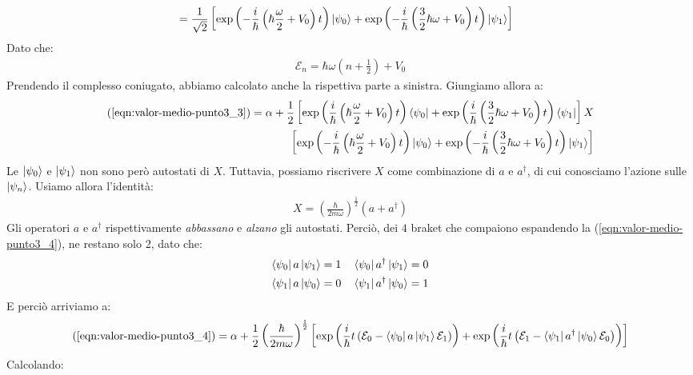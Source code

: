 \documentclass[../../FisicaTeorica.tex]{subfiles}
\begin{document}
\begin{enumerate}
\begin{align*}
\\
\span= \frac{1}{\sqrt{2}} \left[
\exp\left({-\frac{i}{\hbar}\left(\hbar\frac{\omega}{2} + V_0\right)t}\right)\ket{\psi_0} +
\exp\left({-\frac{i}{\hbar}\left(\frac{3}{2}\hbar \omega + V_0\right)t}\right)\ket{\psi_1}
\right]
\end{align*}
Dato che:
\begin{align*}
\mathcal{E}_n = \hbar \omega \left(n+\frac{1}{2}\right) + V_0
\end{align*}
Prendendo il complesso coniugato, abbiamo calcolato anche la rispettiva parte a sinistra. Giungiamo allora a:
\begin{align}\nonumber
(\ref{eqn:valor-medio-punto3_3}) = \alpha +\frac{1}{2}\left[\exp\left(\frac{i}{\hbar}\left(\hbar \frac{\omega}{2}+ V_0\right)t \right)\Bra{\psi_0}+\exp\left(\frac{i}{\hbar}\left(\frac{3}{2}\hbar \omega + V_0\right)t\right)\Bra{\psi_1}\right] X\\
\left[\exp\left(-\frac{i}{\hbar}\left(\hbar \frac{\omega}{2}+V_0\right)t\right) \Ket{\psi_0} + \exp\left(-\frac{i}{\hbar}\left(\frac{3}{2}\hbar \omega + V_0\right) t \right)\Ket{\psi_1}\right]
\label{eqn:valor-medio-punto3_4}
\end{align}
Le $\Ket{\psi_0}$ e $\Ket{\psi_1}$ non sono però autostati di $X$. Tuttavia, possiamo riscrivere $X$ come combinazione di $a$ e $a^\dag$, di cui conosciamo l'azione sulle $\Ket{\psi_n}$. Usiamo allora l'identità:
\begin{align*}
X=\left(\frac{\hbar}{2m\omega}\right)^{\frac{1}{2}} (a+a^\dag)
\end{align*}
Gli operatori $a$ e $a^\dag$ rispettivamente \textit{abbassano} e \textit{alzano} gli autostati. Perciò, dei $4$ braket che compaiono espandendo la (\ref{eqn:valor-medio-punto3_4}), ne restano solo $2$, dato che:
\begin{align*}
\Bra{\psi_0}a\Ket{\psi_1} &= 1 && \Bra{\psi_0} a^\dag \Ket{\psi_1} =0\\
\Bra{\psi_1}a\Ket{\psi_0} &= 0 && \Bra{\psi_1}a^\dag \Ket{\psi_0} =1
\end{align*}
E perciò arriviamo a:
\begin{align*}
(\ref{eqn:valor-medio-punto3_4}) =\alpha+
\frac{1}{2}\left(\frac{\hbar}{2m\omega}\right)^{\frac{1}{2}} \left[
\exp\left(\frac{i}{\hbar}t\left(\mathcal{E}_0 - \Bra{\psi_0}a \Ket{\psi_1}\mathcal{E}_1 \right) \right)+ \exp\left(\frac{i}{\hbar}t\left(\mathcal{E}_1-\Bra{\psi_1}a^\dag \Ket{\psi_0}\mathcal{E}_0\right)\right)\right]
\end{align*}
Calcolando:
\begin{align*}

\end{align*}
\end{enumerate}
\end{document}
